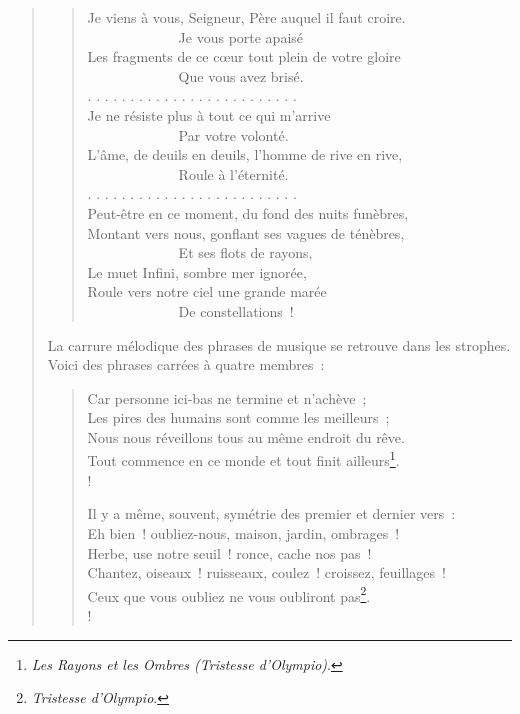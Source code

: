 \documentclass[french,twoside]{book} %
\begin{document}
\begin{verse}
\begin{verse}
Je viens à vous, Seigneur, Père auquel il faut croire.\\
             Je vous porte apaisé\\
Les fragments de ce cœur tout plein de votre gloire\\
             Que vous avez brisé.\\
. . . . . . . . . . . . . . . . . . . . . . . . .\\
Je ne résiste plus à tout ce qui m’arrive\\
             Par votre volonté.\\
L’âme, de deuils en deuils, l’homme de rive en rive,\\
             Roule à l’éternité.\\
. . . . . . . . . . . . . . . . . . . . . . . . .\\
Peut-être en ce moment, du fond des nuits funèbres,\\
Montant vers nous, gonflant ses vagues de ténèbres,\\
             Et ses flots de rayons,\\
Le muet Infini, sombre mer ignorée,\\
Roule vers notre ciel une grande marée\\
             De constellations !\\
\end{verse}

\noindent La carrure mélodique des phrases de musique se retrouve dans les strophes. Voici des phrases carrées à quatre membres :\par


\begin{verse}
Car personne ici-bas ne termine et n’achève ;\\
Les pires des humains sont comme les meilleurs ;\\
Nous nous réveillons tous au même endroit du rêve.\\
Tout commence en ce monde et tout finit ailleurs\footnote{\emph{Les Rayons et les Ombres (Tristesse d’Olympio)}.}.\\!

Il y a même, souvent, symétrie des premier et dernier vers :\\
Eh bien ! oubliez-nous, maison, jardin, ombrages !\\
Herbe, use notre seuil ! ronce, cache nos pas !\\
Chantez, oiseaux ! ruisseaux, coulez ! croissez, feuillages !\\
Ceux que vous oubliez ne vous oubliront pas\footnote{\emph{Tristesse d’Olympio}.}.\\!


\end{verse}
\end{verse}
\end{document}
